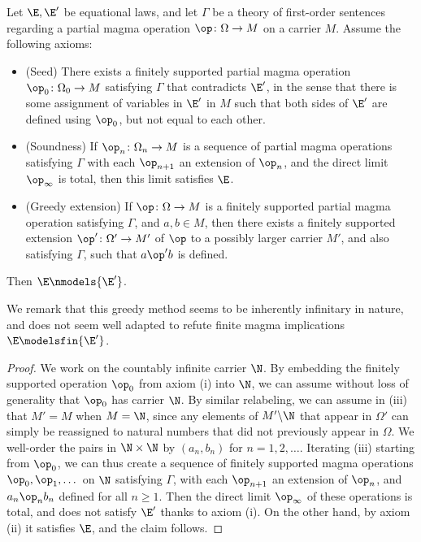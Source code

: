 \begin{theorem}\label{greedy-abstract} Let $\E,{\E'}$ be equational laws, and let $\Gamma$ be a theory of first-order sentences regarding a partial magma operation $\op \colon \Omega \to M$ on a carrier $M$.  Assume the following axioms:
\begin{itemize}
  \item[(i)] (Seed) There exists a finitely supported partial magma operation $\op_0 \colon \Omega_0 \to M$ satisfying $\Gamma$ that contradicts ${\E'}$, in the sense that there is some assignment of variables in ${\E'}$ in $M$ such that both sides of ${\E'}$ are defined using $\op_0$, but not equal to each other.
  \item[(ii)]  (Soundness)  If $\op_n \colon \Omega_n \to M$ is a sequence of partial magma operations satisfying $\Gamma$ with each $\op_{n+1}$ an extension of $\op_n$, and the direct limit $\op_\infty$ is total, then this limit satisfies $\E$.
  \item[(iii)] (Greedy extension)  If $\op \colon \Omega \to M$ is a finitely supported partial magma operation satisfying $\Gamma$, and $a,b \in M$, then there exists a finitely supported extension $\op' \colon \Omega' \to M'$ of $\op$ to a possibly larger carrier $M'$, and also satisfying $\Gamma$, such that $a \op' b$ is defined.
\end{itemize}
Then $\E \nmodels {\E'}$.
\end{theorem}

We remark that this greedy method seems to be inherently infinitary in nature, and does not seem well adapted to refute finite magma implications $\E \modelsfin {\E'}$.

\begin{proof}  We work on the countably infinite carrier $\N$.  By embedding the finitely supported operation $\op_0$ from axiom (i) into $\N$, we can assume without loss of generality that $\op_0$ has carrier $\N$.  By similar relabeling, we can assume in (iii) that $M' = M$ when $M=\N$, since any elements of $M' \backslash \N$ that
appear in $\Omega'$ can simply be reassigned to natural numbers that did not previously appear in $\Omega$.  We well-order the pairs in $\N \times \N$ by $(a_n,b_n)$ for $n=1,2,\dots$.  Iterating (iii) starting from $\op_0$, we can thus create a sequence of finitely supported magma operations $\op_0, \op_1, \dots$ on $\N$ satisfying $\Gamma$, with each $\op_{n+1}$ an extension of $\op_n$, and $a_n \op_n b_n$ defined for all $n \geq 1$.  Then the direct limit $\op_\infty$ of these operations is total, and does not satisfy ${\E'}$ thanks to axiom (i).  On the other hand, by axiom (ii) it satisfies $\E$, and the claim follows.
\end{proof}

